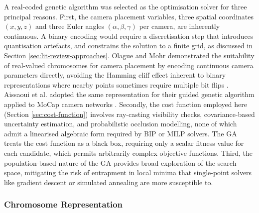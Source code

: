 A real-coded genetic algorithm was selected as the optimisation solver for three principal reasons. First, the camera placement variables, three spatial coordinates $(x, y, z)$ and three Euler angles $(\alpha, \beta, \gamma)$ per camera, are inherently continuous. A binary encoding would require a discretisation step that introduces quantisation artefacts, and constrains the solution to a finite grid, as discussed in Section \ref{sec:lit-review-approaches}. Olague and Mohr demonstrated the suitability of real-valued chromosomes for camera placement by encoding continuous camera parameters directly, avoiding the Hamming cliff effect inherent to binary representations where nearby points sometimes require multiple bit flips \parencite{olagueOptimalCameraPlacement2002}. Aissaoui et al. adopted the same representation for their guided genetic algorithm applied to \gls{MoCap} camera networks \parencite{aissaouiDesigningCameraPlacement2018}. Secondly, the cost function employed here (Section \ref{sec:cost-function}) involves ray-casting visibility checks, covariance-based uncertainty estimation, and probabilistic occlusion modelling, none of which admit a linearised algebraic form required by \gls{BIP} or \gls{MILP} solvers. The GA treats the cost function as a black box, requiring only a scalar fitness value for each candidate, which permits arbitrarily complex objective functions. Third, the population-based nature of the GA provides broad exploration of the search space, mitigating the risk of entrapment in local minima that single-point solvers like gradient descent or simulated annealing are more susceptible to.

\subsubsection{Chromosome Representation}

